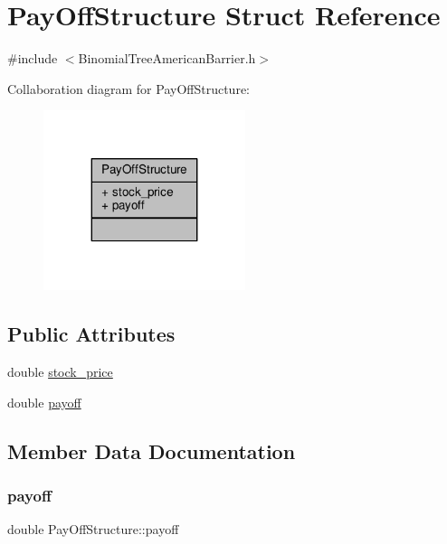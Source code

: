\hypertarget{structPayOffStructure}{}\section{Pay\+Off\+Structure Struct Reference}
\label{structPayOffStructure}


{\ttfamily \#include $<$Binomial\+Tree\+American\+Barrier.\+h$>$}



Collaboration diagram for Pay\+Off\+Structure\+:
\nopagebreak
\begin{figure}[H]
\begin{center}
\leavevmode
\includegraphics[width=167pt]{structPayOffStructure__coll__graph}
\end{center}
\end{figure}
\subsection*{Public Attributes}
\begin{DoxyCompactItemize}
\item 
double \hyperlink{structPayOffStructure_a8a98246aab62c5b12b44f883dbeb768a}{stock\+\_\+price}
\item 
double \hyperlink{structPayOffStructure_acb592cfc94c734609ee65dda117435cd}{payoff}
\end{DoxyCompactItemize}


\subsection{Member Data Documentation}
\hypertarget{structPayOffStructure_acb592cfc94c734609ee65dda117435cd}{}\label{structPayOffStructure_acb592cfc94c734609ee65dda117435cd} 
\subsubsection{\texorpdfstring{payoff}{payoff}}
{\footnotesize\ttfamily double Pay\+Off\+Structure\+::payoff}

